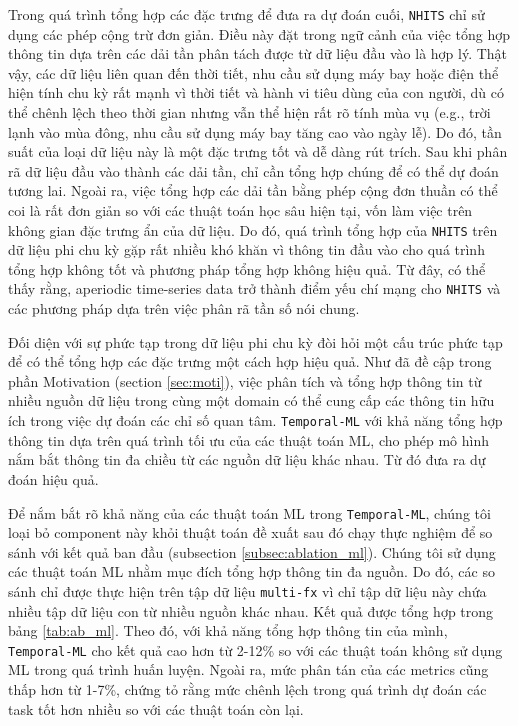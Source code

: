 Trong quá trình tổng hợp các đặc trưng để đưa ra dự đoán cuối, \verb|NHITS| chỉ sử dụng các phép cộng trừ đơn giản. Điều này đặt trong ngữ cảnh của việc tổng hợp thông tin dựa trên các dải tần phân tách được từ dữ liệu đầu vào là hợp lý. Thật vậy, các dữ liệu liên quan đến thời tiết, nhu cầu sử dụng máy bay hoặc điện thể hiện tính chu kỳ rất mạnh vì thời tiết và hành vi tiêu dùng của con người, dù có thể chênh lệch theo thời gian nhưng vẫn thể hiện rất rõ tính mùa vụ (e.g., trời lạnh vào mùa đông, nhu cầu sử dụng máy bay tăng cao vào ngày lễ). Do đó, tần suất của loại dữ liệu này là một đặc trưng tốt và dễ dàng rút trích. Sau khi phân rã dữ liệu đầu vào thành các dải tần, chỉ cần tổng hợp chúng để có thể dự đoán tương lai. Ngoài ra, việc tổng hợp các dải tần bằng phép cộng đơn thuần có thể coi là rất đơn giản so với các thuật toán học sâu hiện tại, vốn làm việc trên không gian đặc trưng ẩn của dữ liệu. Do đó, quá trình tổng hợp của \verb|NHITS| trên dữ liệu phi chu kỳ gặp rất nhiều khó khăn vì thông tin đầu vào cho quá trình tổng hợp không tốt và phương pháp tổng hợp không hiệu quả. Từ đây, có thể thấy rằng, aperiodic time-series data trở thành điểm yếu chí mạng cho \verb|NHITS| và các phương pháp dựa trên việc phân rã tần số nói chung.

Đối diện với sự phức tạp trong dữ liệu phi chu kỳ đòi hỏi một cấu trúc phức tạp để có thể tổng hợp các đặc trưng một cách hợp hiệu quả. Như đã đề cập trong phần Motivation (section \ref{sec:moti}), việc phân tích và tổng hợp thông tin từ nhiều nguồn dữ liệu trong cùng một domain có thể cung cấp các thông tin hữu ích trong việc dự đoán các chỉ số quan tâm. \verb|Temporal-ML| với khả năng tổng hợp thông tin dựa trên quá trình tối ưu của các thuật toán ML, cho phép mô hình nắm bắt thông tin đa chiều từ các nguồn dữ liệu khác nhau. Từ đó đưa ra dự đoán hiệu quả.

Để nắm bắt rõ khả năng của các thuật toán ML trong \verb|Temporal-ML|, chúng tôi loại bỏ component này khỏi thuật toán đề xuất sau đó chạy thực nghiệm để so sánh với kết quả ban đầu (subsection \ref{subsec:ablation_ml}). Chúng tôi sử dụng các thuật toán ML nhằm mục đích tổng hợp thông tin đa nguồn. Do đó, các so sánh chỉ được thực hiện trên tập dữ liệu \verb|multi-fx| vì chỉ tập dữ liệu này chứa nhiều tập dữ liệu con từ nhiều nguồn khác nhau. Kết quả được tổng hợp trong bảng \ref{tab:ab_ml}. Theo đó, với khả năng tổng hợp thông tin của mình, \verb|Temporal-ML| cho kết quả cao hơn từ 2-12\% so với các thuật toán không sử dụng ML trong quá trình huấn luyện. Ngoài ra, mức phân tán của các metrics cũng thấp hơn từ 1-7\%, chứng tỏ rằng mức chênh lệch trong quá trình dự đoán các task tốt hơn nhiều so với các thuật toán còn lại.

